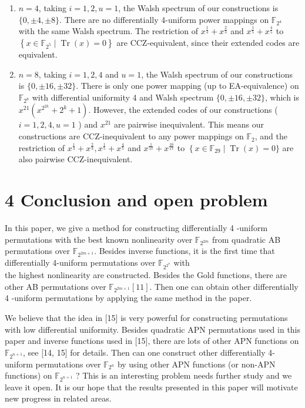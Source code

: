 \documentclass[10pt]{article}
\begin{document}
\begin{enumerate}
  \item $n=4$, taking $i=1,2, u=1$, the Walsh spectrum of our constructions is $\{0, \pm 4, \pm 8\}$. There are no differentially 4-uniform power mappings on $\mathbb{F}_{2^{4}}$ with the same Walsh spectrum. The restriction of $x^{\frac{1}{3}}+x^{\frac{2}{3}}$ and $x^{\frac{1}{5}}+x^{\frac{4}{5}}$ to $\left\{x \in \mathbb{F}_{2^{5}} \mid \operatorname{Tr}(x)=0\right\}$ are CCZ-equivalent, since their extended codes are equivalent.
  \item $n=8$, taking $i=1,2,4$ and $u=1$, the Walsh spectrum of our constructions is $\{0, \pm 16, \pm 32\}$. There is only one power mapping (up to EA-equivalence) on $\mathbb{F}_{2^{8}}$ with differential uniformity 4 and Walsh spectrum $\{0, \pm 16, \pm 32\}$, which is $x^{21}\left(x^{2^{2 k}}+2^{k}+1\right)$. However, the extended codes of our constructions ( $i=1,2,4, u=1$ ) and $x^{21}$ are pairwise inequivalent. This means our constructions are CCZ-inequivalent to any power mappings on $\mathbb{F}_{2}$, and the restriction of $x^{\frac{1}{3}}+x^{\frac{2}{3}}, x^{\frac{1}{5}}+x^{\frac{4}{5}}$ and $x^{\frac{1}{17}}+x^{\frac{16}{17}}$ to $\left\{x \in \mathbb{F}_{29} \mid\right. \operatorname{Tr}(x)=0\}$ are also pairwise CCZ-inequivalent.
\end{enumerate}

\section*{4 Conclusion and open problem}
In this paper, we give a method for constructing differentially 4 -uniform permutations with the best known nonlinearity over $\mathbb{F}_{2^{2 m}}$ from quadratic AB permutations over $\mathbb{F}_{2^{2 m+1}}$. Besides inverse functions, it is the first time that differentially 4-uniform permutations over $\mathbb{F}_{2^{2^{n}}}$ with\\
the highest nonlinearity are constructed. Besides the Gold functions, there are other AB permutations over $\mathbb{F}_{2^{2 m+1}}[11]$. Then one can obtain other differentially 4 -uniform permutations by applying the same method in the paper.

We believe that the idea in [15] is very powerful for constructing permutations with low differential uniformity. Besides quadratic APN permutations used in this paper and inverse functions used in [15], there are lots of other APN functions on $\mathbb{F}_{2^{n+1}}$, see [14, 15] for details. Then can one construct other differentially 4-uniform permutations over $\mathbb{F}_{2^{n}}$ by using other APN functions (or non-APN functions) on $\mathbb{F}_{2^{n+1}}$ ? This is an interesting problem needs further study and we leave it open. It is our hope that the results presented in this paper will motivate new progress in related areas.
\end{document}

